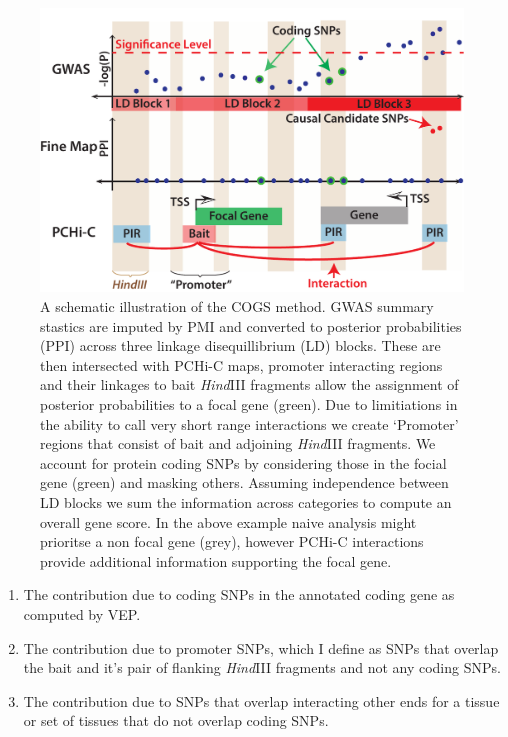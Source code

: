 \documentclass[a4paper,11pt]{report}
\begin{document}
\begin{figure}[h]
\includegraphics[width=\textwidth]{cogs3.pdf}
\caption{A schematic illustration of the COGS method. GWAS summary stastics are imputed by PMI and converted to posterior probabilities (PPI) across three linkage disequillibrium (LD) blocks. These are then intersected with PCHi-C maps, promoter interacting regions and their linkages to bait \textit{Hind}III fragments allow the assignment of posterior probabilities to a focal gene (green). Due to limitiations in the ability to call very short range interactions we create `Promoter' regions that consist of bait and adjoining \textit{Hind}III fragments. We account for protein coding SNPs by considering those in the focial gene (green) and masking others. Assuming independence between LD blocks we sum the information across categories to compute an overall gene score. In the above example naive analysis might prioritse a non focal gene (grey), however PCHi-C interactions provide additional information supporting the focal gene.}
\label{fig:cogs}
\centering
\end{figure}

\begin{enumerate}
\item The contribution due to coding SNPs in the annotated coding gene as computed by VEP.
\item The contribution due to promoter SNPs, which I define as SNPs that overlap the bait and it's pair of flanking \textit{Hind}III fragments and not any coding SNPs.
\item The contribution due to SNPs that overlap interacting other ends for a tissue or set of tissues that do not overlap coding SNPs. 
\end{enumerate}
\end{document}
